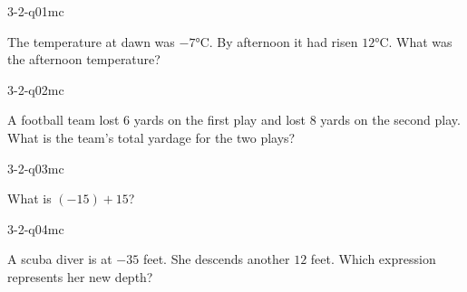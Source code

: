 

\begin{practiceQuestion}{3-2-q01}{mc}
\begin{questionText}
The temperature at dawn was $-7°$C. By afternoon it had risen $12°$C. What was the afternoon temperature?
\end{questionText}
\end{practiceQuestion}

\begin{practiceQuestion}{3-2-q02}{mc}
\begin{questionText}
A football team lost $6$ yards on the first play and lost $8$ yards on the second play. What is the team's total yardage for the two plays?
\end{questionText}
\end{practiceQuestion}

\begin{practiceQuestion}{3-2-q03}{mc}
\begin{questionText}
What is $(-15) + 15$?
\end{questionText}
\end{practiceQuestion}

\begin{practiceQuestion}{3-2-q04}{mc}
\begin{questionText}
A scuba diver is at $-35$ feet. She descends another $12$ feet. Which expression represents her new depth?
\end{questionText}
\end{practiceQuestion}

